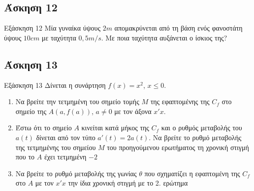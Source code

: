 \documentclass[greek]{beamer}
\begin{document}
\subsection{Άσκηση 12}
\begin{frame}[label=Άσκηση12]{Εξάσκηση 12}
  Μία γυναίκα ύψους $2m$ απομακρύνεται από τη βάση ενός φανοστάτη ύψους $10cm$ με ταχύτητα $0,5m/s$. Με ποια ταχύτητα αυξάνεται ο ίσκιος της?

\end{frame}

\subsection{Άσκηση 13}
\begin{frame}[label=Άσκηση13]{Εξάσκηση 13}
  Δίνεται η συνάρτηση $f(x)=x^2$, $x\le 0$.
  \begin{enumerate}
    \item<1-> Να βρείτε την τετμημένη του σημείο τομής $Μ$ της εφαπτομένης της $C_f$ στο σημείο της $Α(a,f(a))$, $a\ne 0$ με τον άξονα $x'x$.
    \item<2-> Έστω ότι το σημείο $Α$ κινείται κατά μήκος της $C_f$ και ο ρυθμός μεταβολής του $a(t)$ δίνεται από τον τύπο $a'(t)=2a(t)$. Να βρείτε το ρυθμό μεταβολής της τετμημένης του σημείου $Μ$ του προηγούμενου ερωτήματος τη χρονική στιγμή που το $Α$ έχει τετμημένη $-2$
    \item<3-> Να βρείτε το ρυθμό μεταβολής της γωνίας $θ$ που σχηματίζει η εφαπτομένη της $C_f$ στο $Α$ με τον $x'x$ την ίδια χρονική στιγμή με το 2. ερώτημα
  \end{enumerate}

\end{frame}
\end{document}
